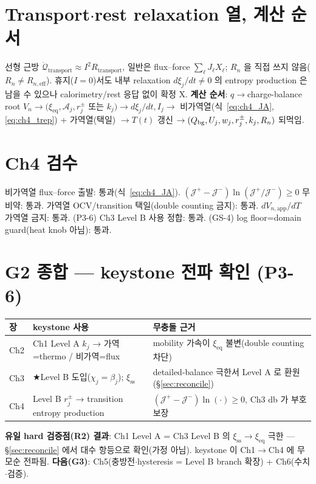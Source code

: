 \documentclass[11pt,a4paper]{article}
\newcommand{\eff}{\mathrm{eff}}\newcommand{\eq}{\mathrm{eq}}\newcommand{\app}{\mathrm{app}}
\begin{document}
\section{Transport$\cdot$rest relaxation 열, 계산 순서}\label{sec:ch4_transport}
선형 근방 $\dot{\mathcal Q}_{\mathrm{transport}}\approx I^2R_{\mathrm{transport}}$, 일반은 flux--force
$\sum_\ell J_\ell X_\ell$; $R_n$ 을 직접 쓰지 않음($R_n\ne R_{n,\eff}$). 휴지($I=0$)서도 내부 relaxation
$d\xi_j/dt\ne0$ 의 entropy production 은 남을 수 있으나 calorimetry/rest 응답 없이 확정 X.
\textbf{계산 순서}: $q\to$charge-balance root $V_n\to(\xi_\eq,\mathcal A_j,r_j^\pm$ 또는 $k_j)\to
d\xi_j/dt,I_j\to$ 비가역열(식~\eqref{eq:ch4_JA},\eqref{eq:ch4_trep}) + 가역열(택일) $\to T(t)$ 갱신
$\to (Q_{\mathrm{bg}},U_j,w_j,r_j^\pm,k_j,R_n)$ 되먹임.

\section{Ch4 검수}\label{sec:ch4_check}
{\small 비가역열 flux--force 출발: 통과(식~\eqref{eq:ch4_JA}). $(\mathcal J^+-\mathcal J^-)\ln(\mathcal J^+/\mathcal J^-)\ge0$
무비약: 통과. 가역열 OCV/transition 택일(double counting 금지): 통과. $dV_{n,\app}/dT$ 가역열 금지:
통과. (P3-6) Ch3 Level B 사용 정합: 통과. (GS-4) log floor=domain guard(heat knob 아님): 통과.}

\section*{G2 종합 — keystone 전파 확인 (P3-6)}
\begin{longtable}{p{} p{} p{}}
\toprule 장 & keystone 사용 & 무충돌 근거 \\ \midrule \endhead
Ch2 & Ch1 Level A $k_j$ → 가역=thermo / 비가역=flux & mobility 가속이 $\xi_\eq$ 불변(double counting 차단) \\
Ch3 & ★Level B 도입($\chi_j=\beta_j$); $\xi_{\mathrm{ss}}$ & detailed-balance 극한서 Level A 로 환원(\S\ref{sec:reconcile}) \\
Ch4 & Level B $r_j^\pm$ → transition entropy production & $(\mathcal J^+-\mathcal J^-)\ln(\cdot)\ge0$, Ch3 db 가 부호 보장 \\
\bottomrule
\end{longtable}
\textbf{유일 hard 검증점(R2) 결과}: Ch1 Level A = Ch3 Level B 의 $\xi_{\mathrm{ss}}\to\xi_\eq$ 극한 —
\S\ref{sec:reconcile} 에서 대수 항등으로 확인(가정 아님). keystone 이 Ch1$\to$Ch4 에 무모순 전파됨.
\textbf{다음(G3)}: Ch5(충방전$\cdot$hysteresis = Level B branch 확장) + Ch6(수치$\cdot$검증).
\end{document}
